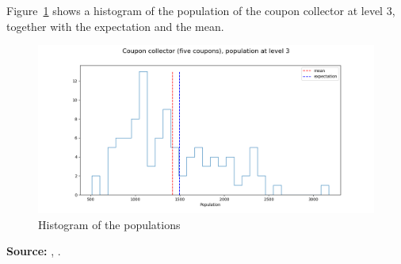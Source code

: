 \documentclass[11pt,a4paper]{article}
\begin{document}
Figure~\ref{f.branching-01} shows a histogram of the population of the coupon collector at level 3, together with the expectation and the mean.

\begin{figure}
\begin{center}
\includegraphics[width=\textwidth]{branching-01}
\caption{Histogram of the populations}\label{f.branching-01}
\end{center}
\end{figure}

\textbf{Source:} \cite[Section 8.2]{privault}, \cite[Problems~4, 14]{mosteller,mos}.


\newpage





\end{document}
